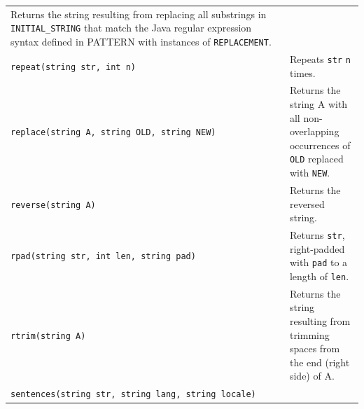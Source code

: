 \documentclass[
]{article}
\begin{document}
\begin{longtable}[]{@{}ll@{}}
\begin{minipage}[t]{0.55\columnwidth}
Returns the string resulting from replacing all substrings in
\texttt{INITIAL\_STRING} that match the Java regular expression syntax
defined in PATTERN with instances of \texttt{REPLACEMENT}.\strut
\end{minipage}\tabularnewline
\begin{minipage}[t]{0.39\columnwidth}\raggedright
\texttt{repeat(string\ str,\ int\ n)}\strut
\end{minipage} & \begin{minipage}[t]{0.55\columnwidth}\raggedright
Repeats \texttt{str} \texttt{n} times.\strut
\end{minipage}\tabularnewline
\begin{minipage}[t]{0.39\columnwidth}\raggedright
\texttt{replace(string\ A,\ string\ OLD,\ string\ NEW)}\strut
\end{minipage} & \begin{minipage}[t]{0.55\columnwidth}\raggedright
Returns the string A with all non-overlapping occurrences of
\texttt{OLD} replaced with \texttt{NEW}.\strut
\end{minipage}\tabularnewline
\begin{minipage}[t]{0.39\columnwidth}\raggedright
\texttt{reverse(string\ A)}\strut
\end{minipage} & \begin{minipage}[t]{0.55\columnwidth}\raggedright
Returns the reversed string.\strut
\end{minipage}\tabularnewline
\begin{minipage}[t]{0.39\columnwidth}\raggedright
\texttt{rpad(string\ str,\ int\ len,\ string\ pad)}\strut
\end{minipage} & \begin{minipage}[t]{0.55\columnwidth}\raggedright
Returns \texttt{str}, right-padded with \texttt{pad} to a length of
\texttt{len}.\strut
\end{minipage}\tabularnewline
\begin{minipage}[t]{0.39\columnwidth}\raggedright
\texttt{rtrim(string\ A)}\strut
\end{minipage} & \begin{minipage}[t]{0.55\columnwidth}\raggedright
Returns the string resulting from trimming spaces from the end (right
side) of A.\strut
\end{minipage}\tabularnewline
\begin{minipage}[t]{0.39\columnwidth}\raggedright
\texttt{sentences(string\ str,\ string\ lang,\ string\ locale)}\strut
\end{minipage} & \begin{minipage}[t]{0.55\columnwidth}\raggedright

\end{minipage}
\end{longtable}
\end{document}

